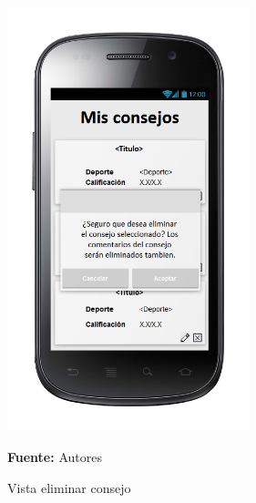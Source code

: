 \begin{figure}[!htb]
  \begin{center}
\includegraphics[width=7cm]{./imagenes/UI/Contenidos/eliminar_consejo.png}
    \caption{Vista eliminar consejo}
    \label{fig:Vista_eliminar_consejo}
    \textbf{Fuente:}  Autores
  \end{center}
\end{figure}
